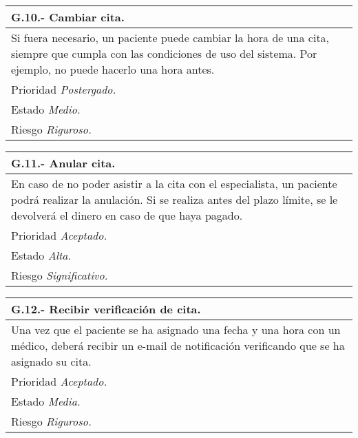 	\begin{center}
	\begin{tabulary}{15cm}{|L|}
		\hline
			\bf{G.10.- Cambiar cita.} \\
		\hline
			Si fuera necesario, un paciente puede cambiar la hora de una cita, siempre que cumpla con las condiciones de uso del sistema. Por ejemplo, no puede hacerlo una hora antes. \\
		\hline
			Prioridad \textit{Postergado.} \\
		\hline
			Estado \textit{Medio.} \\
		\hline
			Riesgo \textit{Riguroso.} \\
		\hline
	\end{tabulary}
	\end{center}

	\begin{center}
	\begin{tabulary}{15cm}{|L|}
		\hline
			\bf{G.11.- Anular cita.} \\
		\hline
			En caso de no poder asistir a la cita con el especialista, un paciente podrá realizar la anulación. Si se realiza antes del plazo límite, se le devolverá el dinero en caso de que haya pagado. \\
		\hline
			Prioridad \textit{Aceptado.} \\
		\hline
			Estado \textit{Alta.} \\
		\hline
			Riesgo \textit{Significativo.} \\
		\hline
	\end{tabulary}
	\end{center}

	\begin{center}
	\begin{tabulary}{15cm}{|L|}
		\hline
			\bf{G.12.- Recibir verificación de cita.} \\
		\hline
			Una vez que el paciente se ha asignado una fecha y una hora con un médico, deberá recibir un e-mail de notificación verificando que se ha asignado su cita. \\
		\hline
			Prioridad \textit{Aceptado.} \\
		\hline
			Estado \textit{Media.} \\
		\hline
			Riesgo \textit{Riguroso.} \\
		\hline
	\end{tabulary}
	\end{center}

